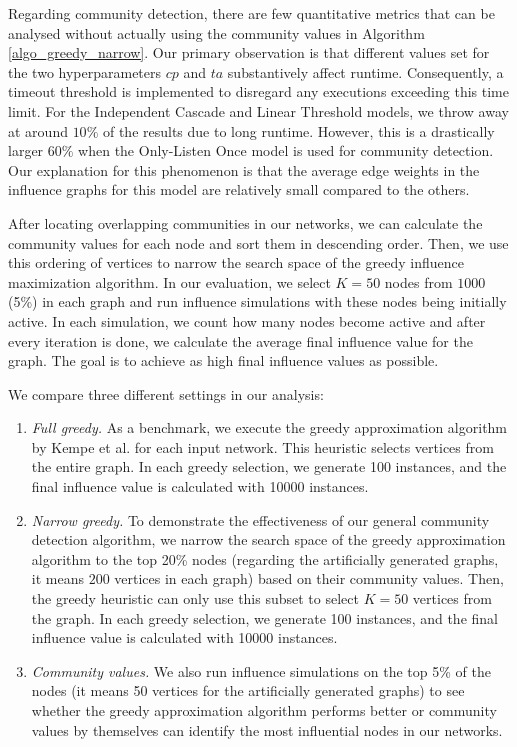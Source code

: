 \documentclass[pdflatex,sn-mathphys-num]{sn-jnl}
\begin{document}
Regarding community detection, there are few quantitative metrics that can be analysed without actually using the community values in Algorithm \ref{algo_greedy_narrow}. Our primary observation is that different values set for the two hyperparameters $cp$ and $ta$ substantively affect runtime. Consequently, a timeout threshold is implemented to disregard any executions exceeding this time limit. For the Independent Cascade and Linear Threshold models, we throw away at around $10\%$ of the results due to long runtime. However, this is a drastically larger $60\%$ when the Only-Listen Once model is used for community detection. Our explanation for this phenomenon is that the average edge weights in the influence graphs for this model are relatively small compared to the others.

After locating overlapping communities in our networks, we can calculate the community values for each node and sort them in descending order. Then, we use this ordering of vertices to narrow the search space of the greedy influence maximization algorithm. In our evaluation, we select $K = 50$ nodes from $1000$ (5\%) in each graph and run influence simulations with these nodes being initially active. In each simulation, we count how many nodes become active and after every iteration is done, we calculate the average final influence value for the graph. The goal is to achieve as high final influence values as possible.

We compare three different settings in our analysis:

\begin{enumerate}
\setlength\itemsep{0.5em}
\item \textit{Full greedy.} As a benchmark, we execute the greedy approximation algorithm by Kempe et al. for each input network. This heuristic selects vertices from the entire graph. In each greedy selection, we generate 100 instances, and the final influence value is calculated with 10000 instances.
\item \textit{Narrow greedy.} To demonstrate the effectiveness of our general community detection algorithm, we narrow the search space of the greedy approximation algorithm to the top 20\% nodes (regarding the artificially generated graphs, it means $200$ vertices in each graph) based on their community values. Then, the greedy heuristic can only use this subset to select $K = 50$ vertices from the graph. In each greedy selection, we generate 100 instances, and the final influence value is calculated with 10000 instances.
\item \textit{Community values.} We also run influence simulations on the top 5\% of the nodes (it means 50 vertices for the artificially generated graphs) to see whether the greedy approximation algorithm performs better or community values by themselves can identify the most influential nodes in our networks.
\end{enumerate}
\end{document}
